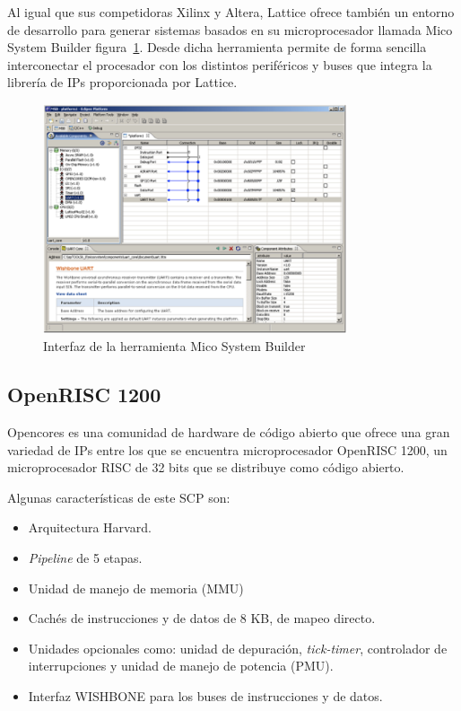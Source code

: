 Al igual que sus competidoras Xilinx y Altera, Lattice ofrece también un entorno de desarrollo para generar sistemas basados en su microprocesador
llamada Mico System Builder figura~\ref{fig:msb}. Desde dicha herramienta permite de forma sencilla interconectar el procesador con los distintos periféricos y buses que
integra la librería de IPs proporcionada por Lattice.

\begin{figure}[h!]
 	\begin{center}
  	\includegraphics[width=0.8\textwidth,keepaspectratio=true]{./images/herramientaslatice}
  	\caption{Interfaz de la herramienta Mico System Builder}
  	\label{fig:msb}
 	\end{center}
	\end{figure}
\newpage
	\subsection{OpenRISC 1200}

Opencores \cite{Etiqueta20} es una comunidad de hardware de código abierto que ofrece una gran variedad de IPs entre los que se encuentra microprocesador OpenRISC 1200, un microprocesador RISC de 32 bits que se distribuye como código abierto.

Algunas características de este SCP son:

\begin{itemize}
		 \item  Arquitectura Harvard.
	 	 \item \textit{Pipeline} de 5 etapas.
	 	 \item  Unidad de manejo de memoria (MMU)
		 \item  Cachés de instrucciones y de datos de 8 KB, de mapeo directo.
 		\item Unidades opcionales como: unidad de depuración,\textit{ tick-timer}, controlador de interrupciones y unidad de manejo de potencia (PMU).
		\item Interfaz WISHBONE para los buses de instrucciones y de datos.
\end{itemize}
  
